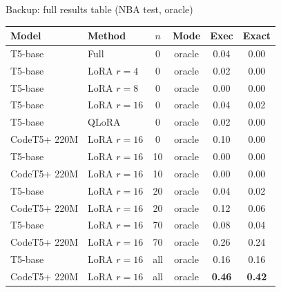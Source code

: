 \documentclass[aspectratio=169,11pt]{beamer}
\begin{document}
\appendix

\begin{frame}{Backup: full results table (NBA test, oracle)}
  \centering\scriptsize
  \begin{tabular}{llcccc}
    \toprule
    \textbf{Model} & \textbf{Method} & \textbf{$n$} & \textbf{Mode} & \textbf{Exec} & \textbf{Exact} \\
    \midrule
    T5-base       & Full           & 0   & oracle & 0.04 & 0.00 \\
    T5-base       & LoRA $r{=}4$   & 0   & oracle & 0.02 & 0.00 \\
    T5-base       & LoRA $r{=}8$   & 0   & oracle & 0.00 & 0.00 \\
    T5-base       & LoRA $r{=}16$  & 0   & oracle & 0.04 & 0.02 \\
    T5-base       & QLoRA          & 0   & oracle & 0.02 & 0.00 \\
    CodeT5+ 220M  & LoRA $r{=}16$  & 0   & oracle & 0.10 & 0.00 \\
    T5-base       & LoRA $r{=}16$  & 10  & oracle & 0.00 & 0.00 \\
    CodeT5+ 220M  & LoRA $r{=}16$  & 10  & oracle & 0.00 & 0.00 \\
    T5-base       & LoRA $r{=}16$  & 20  & oracle & 0.04 & 0.02 \\
    CodeT5+ 220M  & LoRA $r{=}16$  & 20  & oracle & 0.12 & 0.06 \\
    T5-base       & LoRA $r{=}16$  & 70  & oracle & 0.08 & 0.04 \\
    CodeT5+ 220M  & LoRA $r{=}16$  & 70  & oracle & 0.26 & 0.24 \\
    T5-base       & LoRA $r{=}16$  & all & oracle & 0.16 & 0.16 \\
    \alert{CodeT5+ 220M}  & \alert{LoRA $r{=}16$}  & \alert{all} & \alert{oracle} & \alert{\textbf{0.46}} & \alert{\textbf{0.42}} \\
    \bottomrule
  \end{tabular}
\end{frame}
\end{document}
